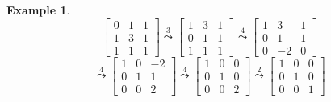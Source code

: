 \documentclass[a4paper,landscape,twocolumn]{article}
\newtheorem{ex}{Example}
\begin{document}
\begin{ex}
  \label{bsp-6.25}
  \[
    \begin{bmatrix}
      0 & 1 & 1 \\
      1 & 3 & 1 \\
      1 & 1 & 1
    \end{bmatrix}
    \overset{3}{\leadsto}
    \begin{bmatrix}
      1 & 3 & 1 \\
      0 & 1 & 1 \\
      1 & 1 & 1
    \end{bmatrix}
    \overset{4}{\leadsto}
    \begin{bmatrix}
      1 & 3 & 1 \\
      0 & 1 & 1 \\
      0 & -2 & 0
    \end{bmatrix}
  \] \[
    \overset{4}{\leadsto}
    \begin{bmatrix}
      1 & 0 & -2 \\
      0 & 1 & 1 \\
      0 & 0 & 2
    \end{bmatrix}
    \overset{4}{\leadsto}
    \begin{bmatrix}
      1 & 0 & 0 \\
      0 & 1 & 0 \\
      0 & 0 & 2
    \end{bmatrix}
    \overset{2}{\leadsto}
    \begin{bmatrix}
      1 & 0 & 0 \\
      0 & 1 & 0 \\
      0 & 0 & 1
    \end{bmatrix}
  \]
\end{ex}
\end{document}
